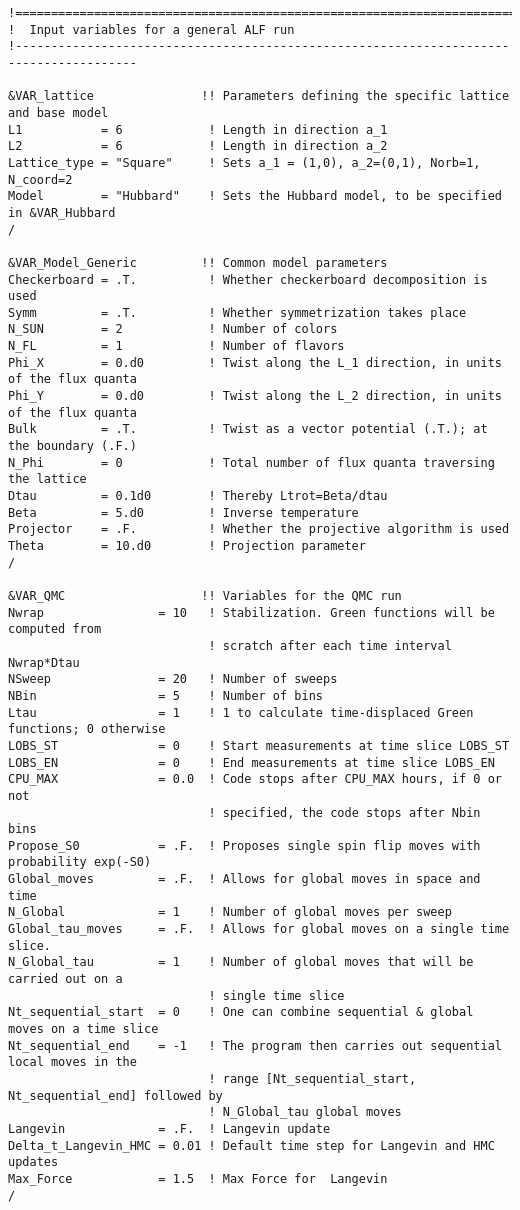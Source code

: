 \begin{lstlisting}[style=fortran,escapechar=\#,breaklines=true]
!=======================================================================================
!  Input variables for a general ALF run
!---------------------------------------------------------------------------------------

&VAR_lattice               !! Parameters defining the specific lattice and base model
L1           = 6            ! Length in direction a_1
L2           = 6            ! Length in direction a_2
Lattice_type = "Square"     ! Sets a_1 = (1,0), a_2=(0,1), Norb=1, N_coord=2
Model        = "Hubbard"    ! Sets the Hubbard model, to be specified in &VAR_Hubbard
/

&VAR_Model_Generic         !! Common model parameters
Checkerboard = .T.          ! Whether checkerboard decomposition is used
Symm         = .T.          ! Whether symmetrization takes place
N_SUN        = 2            ! Number of colors
N_FL         = 1            ! Number of flavors
Phi_X        = 0.d0         ! Twist along the L_1 direction, in units of the flux quanta
Phi_Y        = 0.d0         ! Twist along the L_2 direction, in units of the flux quanta
Bulk         = .T.          ! Twist as a vector potential (.T.); at the boundary (.F.)
N_Phi        = 0            ! Total number of flux quanta traversing the lattice
Dtau         = 0.1d0        ! Thereby Ltrot=Beta/dtau
Beta         = 5.d0         ! Inverse temperature
Projector    = .F.          ! Whether the projective algorithm is used
Theta        = 10.d0        ! Projection parameter
/

&VAR_QMC                   !! Variables for the QMC run
Nwrap                = 10   ! Stabilization. Green functions will be computed from 
                            ! scratch after each time interval Nwrap*Dtau
NSweep               = 20   ! Number of sweeps
NBin                 = 5    ! Number of bins
Ltau                 = 1    ! 1 to calculate time-displaced Green functions; 0 otherwise
LOBS_ST              = 0    ! Start measurements at time slice LOBS_ST
LOBS_EN              = 0    ! End measurements at time slice LOBS_EN
CPU_MAX              = 0.0  ! Code stops after CPU_MAX hours, if 0 or not
                            ! specified, the code stops after Nbin bins
Propose_S0           = .F.  ! Proposes single spin flip moves with probability exp(-S0) 
Global_moves         = .F.  ! Allows for global moves in space and time 
N_Global             = 1    ! Number of global moves per sweep 
Global_tau_moves     = .F.  ! Allows for global moves on a single time slice.  
N_Global_tau         = 1    ! Number of global moves that will be carried out on a 
                            ! single time slice
Nt_sequential_start  = 0    ! One can combine sequential & global moves on a time slice
Nt_sequential_end    = -1   ! The program then carries out sequential local moves in the
                            ! range [Nt_sequential_start, Nt_sequential_end] followed by
                            ! N_Global_tau global moves
Langevin             = .F.  ! Langevin update
Delta_t_Langevin_HMC = 0.01 ! Default time step for Langevin and HMC updates
Max_Force            = 1.5  ! Max Force for  Langevin
/


\end{lstlisting}
